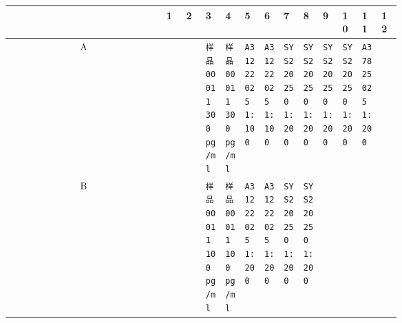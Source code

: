 \documentclass[UTF8,10pt,a4paper,fontset=fandol]{ctexart}
\newcommand{\fieldvalue}[1]{#1}
\begin{document}
\smallskip

\begin{center}
\scriptsize
\begin{tabular}{c|*{12}{p{0.055\linewidth}|}}
 & 1 & 2 & 3 & 4 & 5 & 6 & 7 & 8 & 9 & 10 & 11 & 12\\ \hline
A &
&
&
\fieldvalue{\texttt{样品0001\\1\\300 pg/ml}} &
\fieldvalue{\texttt{样品0001\\1\\300 pg/ml}} &
\fieldvalue{\texttt{A31222025\\1:100}} &
\fieldvalue{\texttt{A31222025\\1:100}} &
\fieldvalue{\texttt{SYS220250\\1:200}} &
\fieldvalue{\texttt{SYS220250\\1:200}} &
\fieldvalue{\texttt{SYS220250\\1:200}} &
\fieldvalue{\texttt{SYS220250\\1:200}} &
\fieldvalue{\texttt{A37825025\\1:200}} &
\\ \hline
B &
&
&
\fieldvalue{\texttt{样品0001\\1\\100 pg/ml}} &
\fieldvalue{\texttt{样品0001\\1\\100 pg/ml}} &
\fieldvalue{\texttt{A31222025\\1:200}} &
\fieldvalue{\texttt{A31222025\\1:200}} &
\fieldvalue{\texttt{SYS220250\\1:200}} &
\fieldvalue{\texttt{SYS220250\\1:200}} &

\end{tabular}
\end{center}
\end{document}

